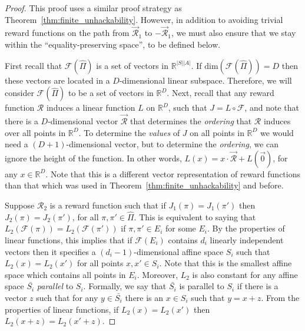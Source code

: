 \begin{proof}
This proof uses a similar proof strategy as Theorem~\ref{thm:finite_unhackability}. However, in addition 
to avoiding trivial reward functions on the path from $\vec{\mathcal{R}}_1$ to $-\vec{\mathcal{R}}_1$, we must also ensure that we stay within the ``equality-preserving space'', to be defined below. 

First recall that $\mathcal{F}(\hat{\Pi})$ is a set of vectors in $\mathbb{R}^{|S||A|}$. If $\mathrm{dim}(\mathcal{F}(\hat{\Pi})) = D$ then these vectors are located in a $D$-dimensional linear subspace. Therefore, we will consider $\mathcal{F}(\hat{\Pi})$ to be a set of vectors in $\mathbb{R}^D$. Next, recall that any reward function $\mathcal{R}$ induces a linear function $L$ on $\mathbb{R}^D$, such that $J = L \circ \mathcal{F}$, and note that there is a $D$-dimensional vector $\vec{\mathcal{R}}$ that determines the \emph{ordering} that $\mathcal{R}$ induces over 
all points in 
$\mathbb{R}^D$. 
To determine the \emph{values} of $J$ on all points in $\mathbb{R}^D$ we would need a $(D+1)$-dimensional vector, but to determine the \emph{ordering}, we can ignore the height of the function. In other words, $L(x) = x \cdot \vec{\mathcal{R}} + L(\vec{0})$, for any $x \in \mathbb{R}^D$. Note that this is a different vector representation of reward functions than that which was used in Theorem~\ref{thm:finite_unhackability} and before.


Suppose $\mathcal{R}_2$ is a reward function such that if $J_1(\pi) = J_1(\pi')$ then $J_2(\pi) = J_2(\pi')$, for all $\pi,\pi' \in \hat{\Pi}$. This is equivalent to saying that $L_2(\mathcal{F}(\pi)) =  L_2(\mathcal{F}(\pi'))$ if $\pi,\pi' \in E_i$ for some $E_i$.
By the properties of linear functions, this implies that if $\mathcal{F}(E_i)$ contains $d_i$ linearly independent vectors then it specifies a $(d_i-1)$-dimensional affine space $S_i$ such that $L_2(x) = L_2(x')$ for all points $x,x' \in S_i$. Note that this is the smallest affine space which contains all points in $E_i$.
Moreover, $L_2$ is also constant for any affine space $\bar{S_i}$ \emph{parallel} to $S_i$. 
Formally, we say that $\bar{S_i}$ is parallel to $S_i$ if there is a vector $z$ such that for any $y \in \bar{S_i}$ there is an $x \in S_i$ such that $y = x + z$. From the properties of linear functions, if $L_2(x) = L_2(x')$ then $L_2(x + z) = L_2(x' + z)$.



\end{proof}
